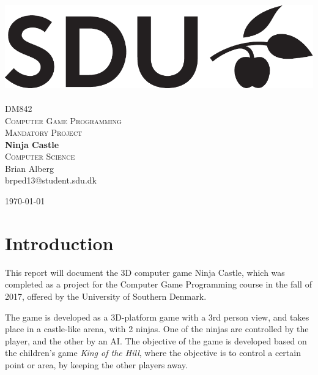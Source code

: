 \documentclass[12pt,a4paper,titlepage]{article}
\author{Brian Alberg}
\date{\today}
\title{}
\begin{document}
\begin{titlepage}
        \begin{center}
        \includegraphics[scale=0.3]{sdu_logos.pdf}~\\[6.0em]
        \textsc{\large{DM842}} \\[0.2em]
        \textsc{\large{Computer Game Programming}}\\[1.5em]
        \textsc{\large{Mandatory Project}}\\[1.5em]
        { \huge \textbf{Ninja Castle}\\[1.5em] }
        \textsc{\large{Computer Science}} \\[6.0em]
        
        \large{Brian Alberg}\\[0.5em]
      \normalsize{brped13@student.sdu.dk}\\[1.5cm]
      
      \vfill

        {\large \today}\\[2em]
        \end{center}
        \newpage
\end{titlepage}

\section{Introduction}
\label{sec-1}
This report will document the 3D computer game Ninja Castle, which was
completed as a project for the Computer Game Programming course in the fall
of 2017, offered by the University of Southern Denmark.

The game is developed as a 3D-platform game with a 3rd person view, and takes
place in a castle-like arena, with 2 ninjas. One of the ninjas are controlled
by the player, and the other by an AI. The objective of the game is developed
based on the children's game \emph{King of the Hill}, where the objective is to
control a certain point or area, by keeping the other players away.
\end{document}
